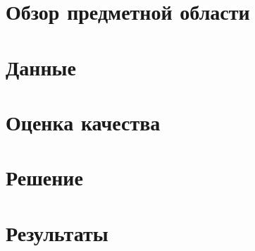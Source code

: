 \documentclass{spbau-diploma}
\begin{document}



\section{Обзор предметной области}
\section{Данные}
\section{Оценка качества}
\section{Решение}
\section{Результаты}



\end{document}
